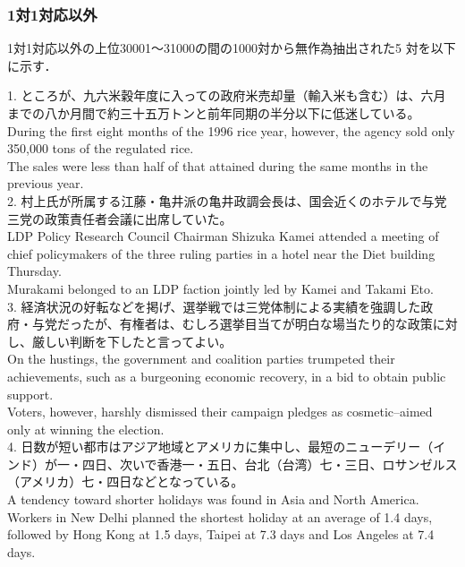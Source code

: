 \subsubsection*{1対1対応以外}

1対1対応以外の上位30001〜31000の間の1000対から無作為抽出された5
対を以下に示す．


\vspace{1em}
\parindent 0cm
\footnotesize

1. ところが、九六米穀年度に入っての政府米売却量（輸入米も含む）は、六月までの八か月間で約三十五万トンと前年同期の半分以下に低迷している。\\
During the first eight months of the 1996 rice year, however, the agency sold only 350,000 tons of the regulated rice. \\
The sales were less than half of that attained during the same months in the previous year. \\

2. 村上氏が所属する江藤・亀井派の亀井政調会長は、国会近くのホテルで与党三党の政策責任者会議に出席していた。\\
LDP Policy Research Council Chairman Shizuka Kamei attended a meeting of chief policymakers of the three ruling parties in a hotel near the Diet building Thursday. \\
Murakami belonged to an LDP faction jointly led by Kamei and Takami Eto. \\

3. 経済状況の好転などを掲げ、選挙戦では三党体制による実績を強調した政府・与党だったが、有権者は、むしろ選挙目当てが明白な場当たり的な政策に対し、厳しい判断を下したと言ってよい。\\
On the hustings, the government and coalition parties trumpeted their achievements, such as a burgeoning economic recovery, in a bid to obtain public support. \\
Voters, however, harshly dismissed their campaign pledges as cosmetic--aimed only at winning the election. \\

4. 日数が短い都市はアジア地域とアメリカに集中し、最短のニューデリー（インド）が一・四日、次いで香港一・五日、台北（台湾）七・三日、ロサンゼルス（アメリカ）七・四日などとなっている。\\
A tendency toward shorter holidays was found in Asia and North America. \\
Workers in New Delhi planned the shortest holiday at an average of 1.4 days, followed by Hong Kong at 1.5 days, Taipei at 7.3 days and Los Angeles at 7.4 days. \\

